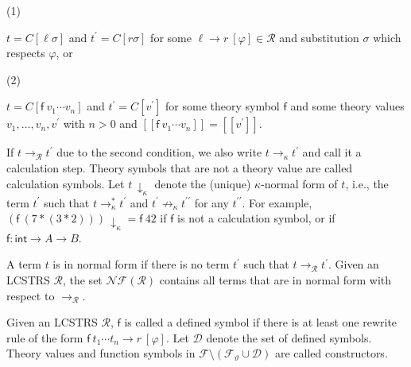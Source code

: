 \par\noindent  (1) 
 
$t={C}[\ell\sigma]$ and $t^{\prime}={C}[r\sigma]$ for some ${\ell}\rightarrow{r}\ [\varphi]\in\mathcal{R}$ and substitution $\sigma$ which respects $\varphi$, or\par
 
 
 
\par\noindent  (2) 
 
$t={C}[{\mathsf{f}}\ {{v}_{1}\cdots{v}_{n}}]$ and $t^{\prime}={C}[v^{\prime}]$ for some theory symbol $\mathsf{f}$ and some theory values ${v}_{1},\ldots,{v}_{n},v^{\prime}$ with $n>0$ and $[\![{\mathsf{f}}\ {{v}_{1}\cdots{v}_{n}}]\!]=[\![v^{\prime}]\!]$.\par
 
 
  
 
 
If $t\rightarrow_{\mathcal{R}}t^{\prime}$ due to the second condition, we also write $t\rightarrow_{\kappa}t^{\prime}$ and call it a calculation step. Theory symbols that are not a theory value are called calculation symbols. Let $t\,{\downarrow}_{\kappa}$ denote the (unique) $\kappa$-normal form of $t$, i.e., the term $t^{\prime}$ such that $t\rightarrow_{\kappa}^{*}t^{\prime}$ and $t^{\prime}\not\rightarrow_{\kappa}t^{\prime\prime}$ for any $t^{\prime\prime}$. For example, $({\mathsf{f}}\ {(7*(3*2))})\,{\downarrow}_{\kappa}={\mathsf{f}}\ {42}$ if $\mathsf{f}$ is not a calculation symbol, or if $\mathsf{f}:\mathsf{int}\rightarrow A\rightarrow B$.\par
 
 
 
A term $t$ is in normal form if there is no term $t^{\prime}$ such that $t\rightarrow_{\mathcal{R}}t^{\prime}$. Given an LCSTRS $\mathcal{R}$, the set $\mathcal{N}\!\mathcal{F}(\mathcal{R})$ contains all terms that are in normal form with respect to $\rightarrow_{\mathcal{R}}$.\par
 
 
 
Given an LCSTRS $\mathcal{R}$, $\mathsf{f}$ is called a defined symbol if there is at least one rewrite rule of the form ${{\mathsf{f}}\ {{t}_{1}\cdots{t}_{n}}}\rightarrow{r}\ [\varphi]$. Let $\mathcal{D}$ denote the set of defined symbols. Theory values and function symbols in $\mathcal{F}\setminus({\mathcal{F}}_{\vartheta}\cup\mathcal{D})$ are called constructors.\par
 
